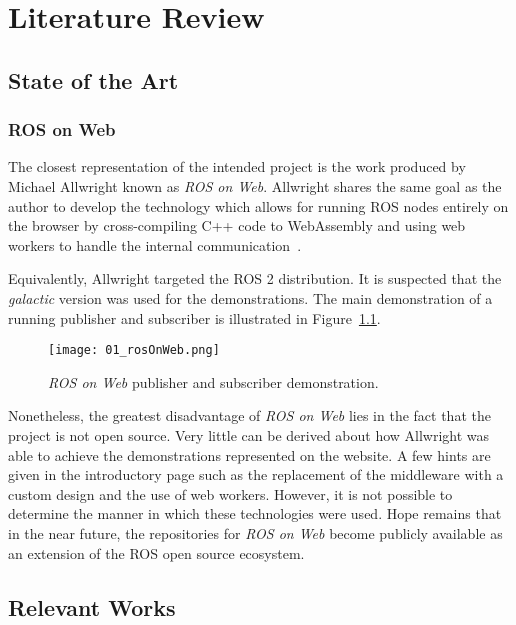 \chapter{Literature Review}\label{cha:literature}

\section{State of the Art}

    \subsection{ROS on Web}

        The closest representation of the intended project is the work produced by Michael Allwright known as \textit{ROS on Web}. Allwright shares the same goal as the author to develop the technology which allows for running ROS nodes entirely on the browser by cross-compiling C++ code to WebAssembly and using web workers to handle the internal communication~\cite{rosonweb}.

        Equivalently, Allwright targeted the \ac{ROS} 2 distribution. It is suspected that the \textit{galactic} version was used for the demonstrations. The main demonstration of a running publisher and subscriber is illustrated in Figure~\ref{fig:rosweb}.
        
        
        \begin{figure}[htbp]
            \centering
            \texttt{[image: 01\_rosOnWeb.png]}
            \caption{\textit{ROS on Web} publisher and subscriber demonstration.}
            \label{fig:rosweb}
        \end{figure}

        Nonetheless, the greatest disadvantage of \textit{ROS on Web} lies in the fact that the project is not open source. Very little can be derived about how Allwright was able to achieve the demonstrations represented on the website. A few hints are given in the introductory page such as the replacement of the middleware with a custom design and the use of web workers. However, it is not possible to determine the manner in which these technologies were used. Hope remains that in the near future, the repositories for \textit{ROS on Web} become publicly available as an extension of the ROS open source ecosystem.


\section{Relevant Works}

